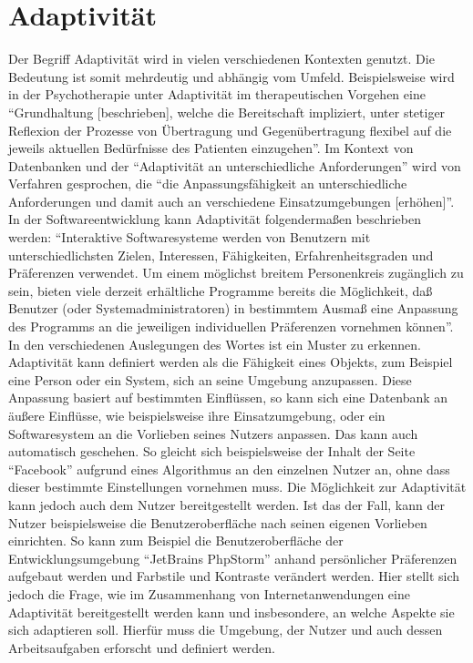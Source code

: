 \documentclass[12pt, paper=a4, bibtotoc, toc=listof, headsepline=true]{scrreprt}
\begin{document}
\chapter{Adaptivität}
Der Begriff Adaptivität wird in vielen verschiedenen Kontexten genutzt. Die Bedeutung ist somit mehrdeutig und abhängig vom Umfeld. Beispielsweise wird in der Psychotherapie unter Adaptivität im therapeutischen Vorgehen eine \enquote{Grundhaltung [beschrieben], welche die Bereitschaft impliziert, unter stetiger Reflexion der Prozesse von Übertragung und Gegenübertragung flexibel auf die jeweils aktuellen Bedürfnisse des Patienten einzugehen}\cite[S. 45]{woeller2014tiefenpsychologisch}. Im Kontext von Datenbanken und der \enquote{Adaptivität an unterschiedliche Anforderungen} wird von Verfahren gesprochen, die \enquote{die Anpassungsfähigkeit an unterschiedliche Anforderungen und damit auch an verschiedene Einsatzumgebungen [erhöhen]}\cite[][S. 112]{loeser2013web}.
In der Softwareentwicklung kann Adaptivität folgendermaßen beschrieben werden: \enquote{Interaktive Softwaresysteme werden von Benutzern mit unterschiedlichsten Zielen, Interessen, Fähigkeiten, Erfahrenheitsgraden und Präferenzen verwendet. Um einem möglichst breitem Personenkreis zugänglich zu sein, bieten viele derzeit erhältliche Programme bereits die Möglichkeit, daß Benutzer (oder Systemadministratoren) in bestimmtem Ausmaß eine Anpassung des Programms an die jeweiligen individuellen Präferenzen vornehmen können}\cite[S. 1]{Kobsa1993}.
\newline In den verschiedenen Auslegungen des Wortes ist ein Muster zu erkennen. Adaptivität kann definiert werden als die Fähigkeit eines Objekts, zum Beispiel eine Person oder ein System, sich an seine Umgebung anzupassen. Diese Anpassung basiert auf bestimmten Einflüssen, so kann sich eine Datenbank an äußere Einflüsse, wie beispielsweise ihre Einsatzumgebung, oder ein Softwaresystem an die Vorlieben seines Nutzers anpassen. Das kann auch automatisch geschehen. So gleicht sich beispielsweise der Inhalt der Seite \enquote{Facebook} aufgrund eines Algorithmus an den einzelnen Nutzer an, ohne dass dieser bestimmte Einstellungen vornehmen muss\cite{Rixecker2016}. Die Möglichkeit zur Adaptivität kann jedoch auch dem Nutzer bereitgestellt werden. Ist das der Fall, kann der Nutzer beispielsweise die Benutzeroberfläche nach seinen eigenen Vorlieben einrichten. So kann zum Beispiel die Benutzeroberfläche der Entwicklungsumgebung \enquote{JetBrains PhpStorm} anhand persönlicher Präferenzen aufgebaut werden und Farbstile und Kontraste verändert werden.
\newline Hier stellt sich jedoch die Frage, wie im Zusammenhang von Internetanwendungen eine Adaptivität bereitgestellt werden kann und insbesondere, an welche Aspekte sie sich adaptieren soll. Hierfür muss die Umgebung, der Nutzer und auch dessen Arbeitsaufgaben erforscht und definiert werden.
\end{document}
